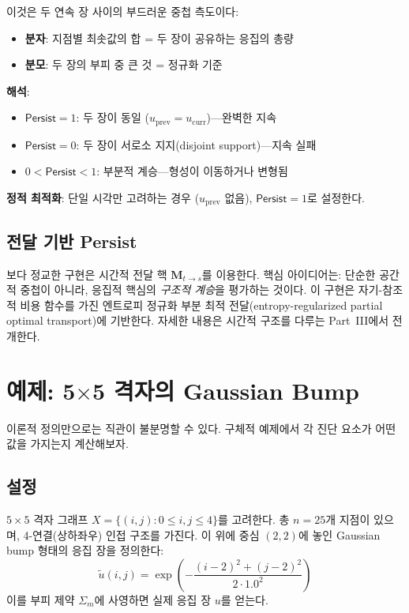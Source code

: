 이것은 두 연속 장 사이의 부드러운 중첩 측도이다:
\begin{itemize}
    \item \textbf{분자}: 지점별 최솟값의 합 = 두 장이 공유하는 응집의 총량
    \item \textbf{분모}: 두 장의 부피 중 큰 것 = 정규화 기준
\end{itemize}

\textbf{해석}:
\begin{itemize}
    \item $\mathsf{Persist} = 1$: 두 장이 동일 ($u_{\mathrm{prev}} = u_{\mathrm{curr}}$)---완벽한 지속
    \item $\mathsf{Persist} = 0$: 두 장이 서로소 지지(disjoint support)---지속 실패
    \item $0 < \mathsf{Persist} < 1$: 부분적 계승---형성이 이동하거나 변형됨
\end{itemize}

\textbf{정적 최적화}: 단일 시각만 고려하는 경우 ($u_{\mathrm{prev}}$ 없음), $\mathsf{Persist} = 1$로 설정한다.


\subsection{전달 기반 Persist}

보다 정교한 구현은 시간적 전달 핵 $\mathbf{M}_{t \to s}$를 이용한다. 핵심 아이디어는: 단순한 공간적 중첩이 아니라, 응집적 핵심의 \emph{구조적 계승}을 평가하는 것이다. 이 구현은 자기-참조적 비용 함수를 가진 엔트로피 정규화 부분 최적 전달(entropy-regularized partial optimal transport)에 기반한다. 자세한 내용은 시간적 구조를 다루는 Part~III에서 전개한다.


\section{예제: 5$\times$5 격자의 Gaussian Bump}
\label{sec:example-gaussian}

이론적 정의만으로는 직관이 불분명할 수 있다. 구체적 예제에서 각 진단 요소가 어떤 값을 가지는지 계산해보자.


\subsection{설정}

$5 \times 5$ 격자 그래프 $X = \{(i,j) : 0 \leq i,j \leq 4\}$를 고려한다. 총 $n = 25$개 지점이 있으며, 4-연결(상하좌우) 인접 구조를 가진다. 이 위에 중심 $(2,2)$에 놓인 Gaussian bump 형태의 응집 장을 정의한다:
\begin{equation}
    \tilde{u}(i,j) = \exp\!\left(-\frac{(i-2)^2 + (j-2)^2}{2 \cdot 1.0^2}\right)
    \label{eq:gaussian-bump-raw}
\end{equation}
이를 부피 제약 $\Sigma_m$에 사영하면 실제 응집 장 $u$를 얻는다.

